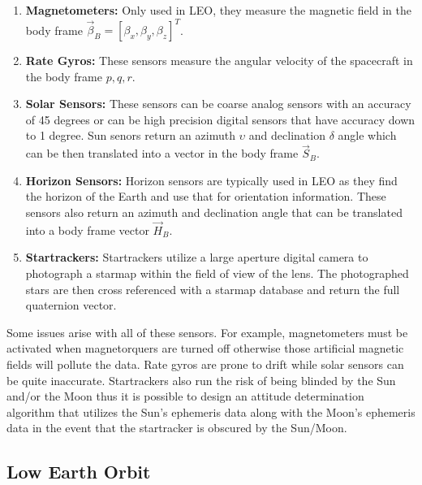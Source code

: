 \documentclass{article}
\begin{document}
\begin{enumerate}[itemsep=-5pt]
  \item {\bf Magnetometers:} Only used in LEO, they measure the
    magnetic field in the body frame $\vec{\beta}_B = [\beta_x,\beta_y,\beta_z]^T$.
    \item {\bf Rate Gyros:} These sensors measure the angular velocity
      of the spacecraft in the body frame $p,q,r$.
    \item {\bf Solar Sensors:} These sensors can be coarse analog
      sensors with an accuracy of 45 degrees or can be high precision
      digital sensors that have accuracy down to 1 degree. Sun senors
      return an azimuth $\upsilon$ and declination $\delta$ angle which can be then
      translated into a vector in the body frame $\vec{S}_B$.
    \item {\bf Horizon Sensors:} Horizon sensors are typically used in
      LEO as they find the horizon of the Earth and use that for
      orientation information. These sensors also return an azimuth
      and declination angle that can be translated into a body frame
      vector $\vec{H}_B$.
      \item {\bf Startrackers:} Startrackers utilize a large aperture
        digital camera to photograph a starmap within the field of
        view of the lens. The photographed stars are then cross
        referenced with a starmap database and return the full
        quaternion vector.
\end{enumerate}

Some issues arise with all of these sensors. For example,
magnetometers must be activated when magnetorquers are turned off
otherwise those artificial magnetic fields will pollute the data. Rate
gyros are prone to drift while solar sensors can be quite
inaccurate. Startrackers also run the risk of being blinded by the Sun
and/or the Moon thus it is possible to design an
attitude determination algorithm that utilizes the Sun's ephemeris data
along with the Moon's ephemeris data in the event that the startracker
is obscured by the Sun/Moon.

\subsection{Low Earth Orbit}
\end{document}
